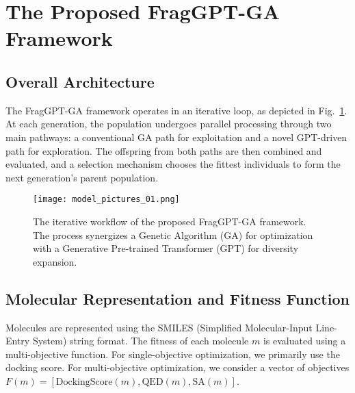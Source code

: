 \documentclass[letterpaper,journal]{IEEEtran}
\begin{document}
\section{The Proposed FragGPT-GA Framework}
\subsection{Overall Architecture}
The FragGPT-GA framework operates in an iterative loop, as depicted in Fig.~\ref{fig:flowchart}. At each generation, the population undergoes parallel processing through two main pathways: a conventional GA path for exploitation and a novel GPT-driven path for exploration. The offspring from both paths are then combined and evaluated, and a selection mechanism chooses the fittest individuals to form the next generation's parent population.

\begin{figure}[!t]
\centering
\texttt{[image: model\_pictures\_01.png]}
\caption{The iterative workflow of the proposed FragGPT-GA framework. The process synergizes a Genetic Algorithm (GA) for optimization with a Generative Pre-trained Transformer (GPT) for diversity expansion.}
\label{fig:flowchart}
\end{figure}

\subsection{Molecular Representation and Fitness Function}
Molecules are represented using the SMILES (Simplified Molecular-Input Line-Entry System) string format. The fitness of each molecule $m$ is evaluated using a multi-objective function. For single-objective optimization, we primarily use the docking score. For multi-objective optimization, we consider a vector of objectives $F(m) = [\text{DockingScore}(m), \text{QED}(m), \text{SA}(m)]$.
\end{document}
